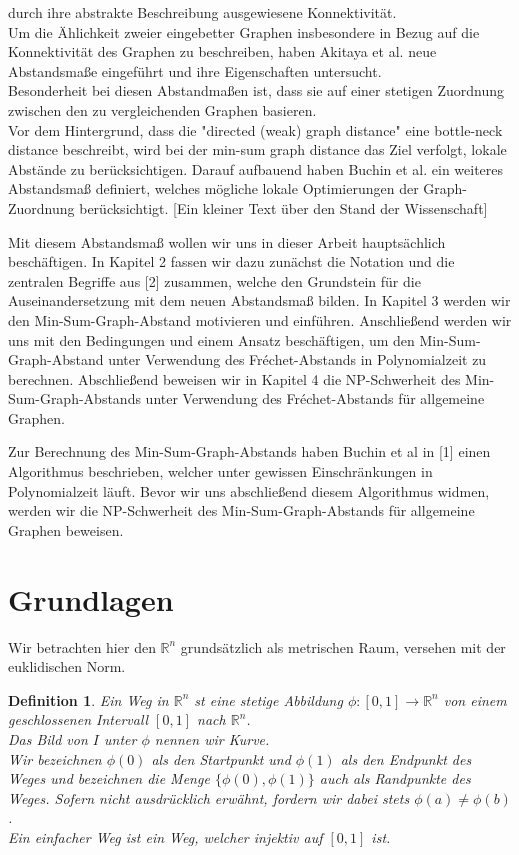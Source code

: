 \documentclass[a4paper, 12pt, twoside]{article}
\theoremstyle{Format1} %
\newtheorem{Def}{Definition}[section]       %
\begin{document}
durch ihre abstrakte Beschreibung ausgewiesene Konnektivität.
\\
Um die Ählichkeit zweier eingebetter Graphen insbesondere in Bezug auf die Konnektivität des Graphen zu beschreiben, haben Akitaya et al. \cite{Akitaya} neue Abstandsmaße eingeführt und ihre Eigenschaften untersucht.
\\
Besonderheit bei diesen Abstandmaßen ist, dass sie auf einer stetigen Zuordnung zwischen den zu vergleichenden Graphen basieren.
\\
Vor dem Hintergrund, dass die "directed (weak) graph distance" eine bottle-neck distance beschreibt, wird bei der min-sum graph distance das Ziel verfolgt, lokale Abstände zu berücksichtigen.
Darauf aufbauend haben \cite{Buchin} Buchin et al. ein weiteres Abstandsmaß definiert, welches mögliche lokale Optimierungen der Graph-Zuordnung berücksichtigt.
[Ein kleiner Text über den Stand der Wissenschaft]

Mit diesem Abstandsmaß wollen wir uns in dieser Arbeit hauptsächlich beschäftigen.
In Kapitel 2 fassen wir dazu zunächst die Notation und die zentralen Begriffe aus [2] zusammen, welche den Grundstein für die Auseinandersetzung mit dem neuen Abstandsmaß bilden.
In Kapitel 3 werden wir den Min-Sum-Graph-Abstand motivieren und einführen. Anschließend werden wir uns mit den Bedingungen und einem Ansatz beschäftigen, um den Min-Sum-Graph-Abstand
unter Verwendung des Fréchet-Abstands in Polynomialzeit zu berechnen.
Abschließend beweisen wir in Kapitel 4 die NP-Schwerheit des Min-Sum-Graph-Abstands unter Verwendung des Fréchet-Abstands für allgemeine Graphen.

Zur Berechnung des Min-Sum-Graph-Abstands haben Buchin et al in [1] einen Algorithmus beschrieben, welcher unter gewissen Einschränkungen in Polynomialzeit läuft.
Bevor wir uns abschließend diesem Algorithmus widmen, werden wir die NP-Schwerheit des Min-Sum-Graph-Abstands für allgemeine Graphen beweisen.
\newpage

\section{Grundlagen}
Wir betrachten hier den $ \mathbb{R}^n $ grundsätzlich als metrischen Raum, versehen mit der euklidischen Norm.
\begin{Def}
	Ein \textit{Weg} in $\mathbb{R}^n$ st eine stetige Abbildung $ \phi: [0,1] \to \mathbb{R}^n $ von einem geschlossenen Intervall $[0,1]$ nach $\mathbb{R}^n$.
	\\
	Das Bild von $I$ unter $\phi$ nennen wir \textit{Kurve}.
	\\
	Wir bezeichnen $\phi(0)$ als den \textit{Startpunkt} und $\phi(1)$ als den \textit{Endpunkt} des Weges und bezeichnen die Menge
	$\{\phi(0), \phi(1)\}$ auch als Randpunkte des Weges. Sofern nicht ausdrücklich erwähnt, fordern wir dabei stets $\phi(a) \neq \phi(b)$.
	\\
	Ein \textit{einfacher Weg} ist ein Weg, welcher injektiv auf $[0,1]$ ist.
\end{Def}
\end{document}

